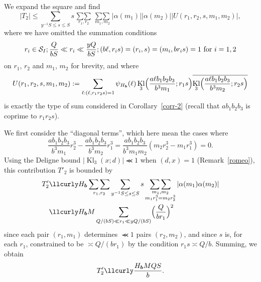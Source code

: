\documentclass[12pt,a4paper,reqno]{amsart}
\numberwithin{equation}{section}
\DeclareMathOperator{\hypk}{Kl}
\theoremstyle{plain}
\theoremstyle{definition}
\newcommand\Scal{\mathcal{S}}
\newcommand{\uple}[1]{\text{\boldmath${#1}$}}
\def\stacksum#1#2{{\stackrel{{\scriptstyle #1}}
{{\scriptstyle #2}}}}
\newcommand\sumsum{\mathop{\sum\sum}\limits}
\renewcommand{\sim}{\asymp}
\renewcommand{\lessapprox}{\llcurly}
\begin{document}
We expand the square and find 
$$
|T_2| \leq  \sum_{y^{-1}S\leq s\leq S}s\sumsum_{r_1,r_2} \sumsum_{m_1,m_2}
|\alpha(m_1)| |\alpha(m_2)| |U(r_1,r_2,s,m_1,m_2)|,
$$
where we have omitted the summation conditions
$$ r_i \in \Scal_I; \frac{Q}{bS}\ll r_i \ll \frac{yQ}{bS}; (b \ell, r_i s ) = (r_i,s) = (m_i,br_is) = 1 \hbox{ for } i=1,2$$
on $r_1$, $r_2$ and $m_1$,
$m_2$ for brevity, and where
$$
U(r_1,r_2,s,m_1,m_2):=
\sum_{\ell: (\ell,r_1r_2s)=1}\psi_{H_{\uple{b}}}(\ell)\hypk_3\Bigl(\frac{a\ell b_1b_2b_3}{b^3m_1};r_1s\Bigr)
\overline{\hypk_3\Bigl(\frac{a\ell b_1b_2b_3}{b^3m_2};r_2s\Bigr)}
$$
is exactly the type of sum considered in Corollary~\ref{corr-2}
(recall that  $ab_1b_2b_3$ is coprime to $r_1r_2 s$). 

We first consider the ``diagonal terms'', which here mean the
cases where 
$$
\frac{ab_1b_2b_3}{b^3m_1}r_2^3-\frac{ab_1b_2b_3}{b^3m_2}r_1^3=
\frac{ab_1b_2b_3}{b^3m_1m_2}(m_2r_2^3-m_1r_1^3)=0.
$$ 
Using the Deligne bound $|\hypk_3(x;d)|\lessapprox 1$ when $(d,x)=1$
(Remark~\ref{romeo}), this contribution $T'_2$ is bounded by
\begin{align*}
  T'_2&\lessapprox H_{\uple{b}}\sumsum_{r_1,r_2}\sum_{y^{-1}S\leq
    s\leq
    S}s \sumsum_{\substack{m_1,m_2\\ m_1r_1^3=m_2r_2^3}}|\alpha(m_1)\alpha(m_2)|\\
  &\lessapprox H_{\uple{b}}M\sum_{Q/(bS)\ll r_1\ll
    yQ/(bS)}\Bigl(\frac{Q}{br_1}\Bigr)^2
\end{align*}
since each pair $(r_1,m_1)$ determines $\lessapprox 1$ pairs
$(r_2,m_2)$, and since $s$ is, for each $r_1$, constrained to be $\sim
Q/(br_1)$ by the condition $r_1s\sim Q/b$. Summing, we obtain
\begin{equation}\label{eq-tp2}
T'_2\lessapprox \frac{H_{\uple{b}}MQS}{b}.
\end{equation}
\end{document}
